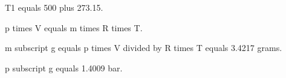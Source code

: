 T1 equals 500 plus 273.15.  

p times V equals m times R times T.  

m subscript g equals p times V divided by R times T equals 3.4217 grams.  

p subscript g equals 1.4009 bar.